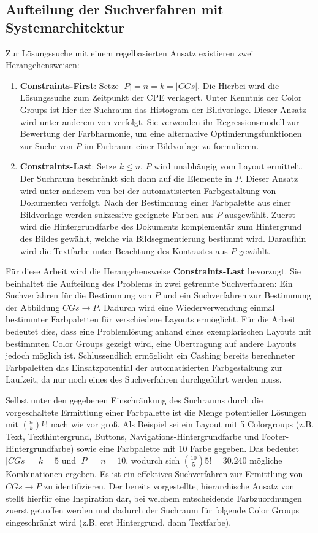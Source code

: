 \documentclass[11pt, bibliography=totoc]{scrartcl}
\begin{document}
\subsection{Aufteilung der Suchverfahren mit Systemarchitektur}

Zur Lösungssuche mit einem regelbasierten Ansatz existieren zwei Herangehensweisen:
\begin{enumerate}
    \item \textbf{Constraints-First}: Setze $|P| = n = k = |CGs|$. Die Hierbei wird die Lösungssuche zum Zeitpunkt der CPE verlagert. Unter Kenntnis der Color Groups ist hier der Suchraum das Histogram der Bildvorlage. Dieser Ansatz wird unter anderem von \citet{colorcomp} verfolgt. Sie verwenden ihr Regressionsmodell zur Bewertung der Farbharmonie, um eine alternative Optimierungsfunktionen zur Suche von $P$ im Farbraum einer Bildvorlage zu formulieren.
    \item \textbf{Constraints-Last}: Setze $k \leq n$. $P$ wird unabhängig vom Layout ermittelt. Der Suchraum beschränkt sich dann auf die Elemente in $P$. Dieser Ansatz wird unter anderem von \citet{documentpalette} bei der automatisierten Farbgestaltung von Dokumenten verfolgt. Nach der Bestimmung einer Farbpalette aus einer Bildvorlage werden sukzessive geeignete Farben aus $P$ ausgewählt. Zuerst wird die Hintergrundfarbe des Dokuments komplementär zum Hintergrund des Bildes gewählt, welche via Bildsegmentierung bestimmt wird. Daraufhin wird die Textfarbe unter Beachtung des Kontrastes aus $P$ gewählt.
\end{enumerate}

Für diese Arbeit wird die Herangehensweise \textbf{Constraints-Last} bevorzugt. Sie beinhaltet die Aufteilung des Problems in zwei getrennte Suchverfahren: Ein Suchverfahren für die Bestimmung von $P$ und ein Suchverfahren zur Bestimmung der Abbildung $CGs \to P$. Dadurch wird eine Wiederverwendung einmal bestimmter Farbpaletten für verschiedene Layouts ermöglicht. Für die Arbeit bedeutet dies, dass eine Problemlösung anhand eines exemplarischen Layouts mit bestimmten Color Groups gezeigt wird, eine Übertragung auf andere Layouts jedoch möglich ist. Schlussendlich ermöglicht ein Cashing bereits berechneter Farbpaletten das Einsatzpotential der automatisierten Farbgestaltung zur Laufzeit, da nur noch eines des Suchverfahren durchgeführt werden muss.

Selbst unter den gegebenen Einschränkung des Suchraums durch die vorgeschaltete Ermittlung einer Farbpalette ist die Menge potentieller Lösungen mit $\binom{n}{k} k!$ nach wie vor groß. Als Beispiel sei ein Layout mit 5 Colorgroups (z.B. Text, Texthintergrund, Buttons, Navigations-Hintergrundfarbe und Footer-Hintergrundfarbe) sowie eine Farbpalette mit 10 Farbe gegeben. Das bedeutet $|CGs| = k = 5$ und $|P| = n = 10$, wodurch sich $\binom{10}{5} 5! = 30.240$ mögliche Kombinationen ergeben. Es ist ein effektives Suchverfahren zur Ermittlung von $CGs \to P$ zu identifizieren. Der bereits vorgestellte, hierarchische Ansatz von \citet{documentpalette} stellt hierfür eine Inspiration dar, bei welchem entscheidende Farbzuordnungen zuerst getroffen werden und dadurch der Suchraum für folgende Color Groups eingeschränkt wird (z.B. erst Hintergrund, dann Textfarbe).
\end{document}
